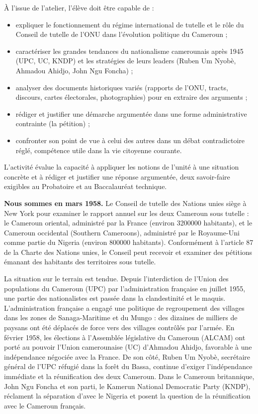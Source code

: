 \documentclass[11pt]{article}
\newcommand{\cle}[1]{{\popxbold\color{popdark}#1}}
\newcounter{popsec}
\newcounter{popsub}
\newcommand{\courssub}[1]{%
  \stepcounter{popsub}%
  \par\vspace{9pt}\noindent{\popxbold\fontsize{11.5}{13}\selectfont\color{popink}{\color{poporange}\thepopsec.\thepopsub}\hspace{6pt}#1}\par\nopagebreak\vspace{4pt}
}
\begin{document}
À l'issue de l'atelier, l'élève doit être capable de :
\begin{itemize}
\item expliquer le fonctionnement du régime international de tutelle et le rôle du Conseil de tutelle de l'ONU dans l'évolution politique du Cameroun ;
\item caractériser les grandes tendances du nationalisme camerounais après 1945 (UPC, UC, KNDP) et les stratégies de leurs leaders (Ruben Um Nyobè, Ahmadou Ahidjo, John Ngu Foncha) ;
\item analyser des documents historiques variés (rapports de l'ONU, tracts, discours, cartes électorales, photographies) pour en extraire des arguments ;
\item rédiger et justifier une démarche argumentée dans une forme administrative contrainte (la pétition) ;
\item confronter son point de vue à celui des autres dans un débat contradictoire réglé, compétence utile dans la vie citoyenne courante.
\end{itemize}

\begin{aretenir}
L'activité évalue la capacité à \cle{appliquer les notions de l'unité à une situation concrète} et à \cle{rédiger et justifier une réponse argumentée}, deux savoir-faire exigibles au Probatoire et au Baccalauréat technique.
\end{aretenir}

\courssub{Situation}

\textbf{Nous sommes en mars 1958.} Le Conseil de tutelle des Nations unies siège à New York pour examiner le rapport annuel sur les deux Cameroun sous tutelle : le Cameroun oriental, administré par la France (environ \num{3 200 000} habitants), et le Cameroun occidental (Southern Cameroons), administré par le Royaume-Uni comme partie du Nigeria (environ \num{800 000} habitants). Conformément à l'article 87 de la Charte des Nations unies, le Conseil peut recevoir et examiner des \cle{pétitions} émanant des habitants des territoires sous tutelle.

La situation sur le terrain est tendue. Depuis l'interdiction de l'Union des populations du Cameroun (UPC) par l'administration française en juillet 1955, une partie des nationalistes est passée dans la clandestinité et le maquis. L'administration française a engagé une politique de \cle{regroupement des villages} dans les zones de Sanaga-Maritime et du Mungo : des dizaines de milliers de paysans ont été déplacés de force vers des villages contrôlés par l'armée. En février 1958, les élections à l'Assemblée législative du Cameroun (ALCAM) ont porté au pouvoir l'Union camerounaise (UC) d'Ahmadou Ahidjo, favorable à une indépendance négociée avec la France. De son côté, Ruben Um Nyobè, secrétaire général de l'UPC réfugié dans la forêt du Bassa, continue d'exiger l'indépendance immédiate et la réunification des deux Cameroun. Dans le Cameroun britannique, John Ngu Foncha et son parti, le Kamerun National Democratic Party (KNDP), réclament la séparation d'avec le Nigeria et posent la question de la réunification avec le Cameroun français.
\end{document}

